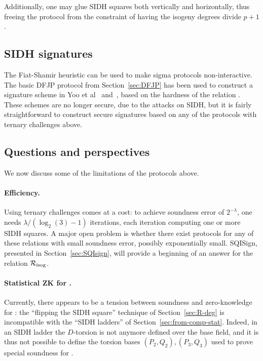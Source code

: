 Additionally, one may glue SIDH squares both vertically and
horizontally, thus freeing the protocol from the constraint of having
the isogeny degrees divide $p+1$.


\subsection{SIDH signatures}

The Fiat-Shamir heuristic can be used to make sigma protocols non-interactive.
The basic DFJP protocol from Section~\ref{sec:DFJP} has been used to construct a signature scheme in Yoo et al~\cite{YAJJS17} and~\cite{GPS20}, based on the hardness of the relation \R[isog]. 
These schemes are no longer secure, due to the attacks on SIDH, but it is fairly straightforward to construct secure signatures based on any of the protocols with ternary challenges above.



%
%


\subsection{Questions and perspectives}

We now discuss some of the limitations of the protocols above.

\paragraph{Efficiency.}
Using ternary challenges comes at a cost: to achieve soundness error of $2^{-\lambda}$, one needs $\lambda/(\log_2(3)-1)$ iterations, each iteration computing one or more SIDH squares.
A major open problem is whether there exist protocols for any of these relations with small soundness error, possibly exponentially small.
SQISign, presented in Section~\ref{sec:SQIsign}, will provide a beginning of an answer for the relation $\R[isog]$.

\paragraph{Statistical ZK for \R[deg].}
Currently, there appears to be a tension between soundness and
zero-knowledge for \R[deg]: the ``flipping the SIDH square'' technique
of Section~\ref{sec:R-deg} is incompatible with the ``SIDH ladders''
of Section~\ref{sec:from-comp-stat}.  Indeed, in an SIDH ladder the
$D$-torsion is not anymore defined over the base field, and it is thus
not possible to define the torsion bases $(P_2,Q_2),(P_3,Q_3)$ used to
prove special soundness for \R[deg].

